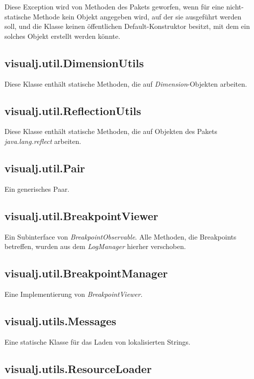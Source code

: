 \documentclass[a4paper]{report}
\begin{document}
Diese Exception wird von Methoden des Pakets geworfen, wenn für eine nicht-statische Methode kein Objekt angegeben wird, auf der sie ausgeführt werden soll, und die Klasse keinen öffentlichen Default-Konstruktor besitzt, mit dem ein solches Objekt erstellt werden könnte.

\subsection{visualj.util.DimensionUtils}

Diese Klasse enthält statische Methoden, die auf \emph{Dimension}-Objekten arbeiten.

\subsection{visualj.util.ReflectionUtils}

Diese Klasse enthält statische Methoden, die auf Objekten des Pakets \emph{java.lang.reflect} arbeiten.

\subsection{visualj.util.Pair}

Ein generisches Paar.

\subsection{visualj.util.BreakpointViewer}

Ein Subinterface von \emph{BreakpointObservable}. Alle Methoden, die Breakpoints betreffen, wurden aus dem \emph{LogManager} hierher verschoben.

\subsection{visualj.util.BreakpointManager}

Eine Implementierung von \emph{BreakpointViewer}.

\subsection{visualj.utils.Messages}

Eine statische Klasse für das Laden von lokalisierten Strings.

\subsection{visualj.utils.ResourceLoader}
\end{document}
